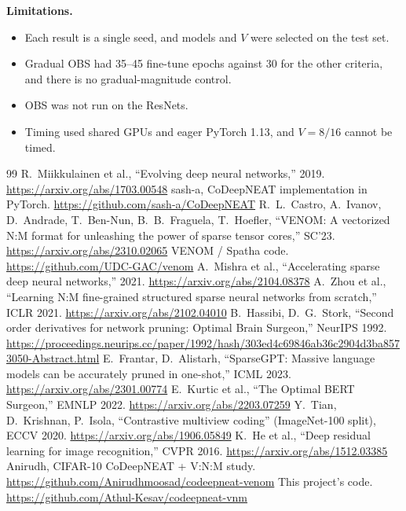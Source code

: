 \documentclass[10pt,a4paper]{article}
\newcommand{\B}[1]{\textbf{#1}}
\begin{document}
\B{Limitations.}
\begin{itemize}
\item Each result is a single seed, and models and $V$ were selected on the test set.
\item Gradual OBS had 35--45 fine-tune epochs against 30 for the other criteria, and there is no gradual-magnitude control.
\item OBS was not run on the ResNets.
\item Timing used shared GPUs and eager PyTorch 1.13, and $V{=}8/16$ cannot be timed.
\end{itemize}

\begin{thebibliography}{99}\small
\setlength{\itemsep}{0pt}
 R.~Miikkulainen et al., ``Evolving deep neural networks,'' 2019. \url{https://arxiv.org/abs/1703.00548}
 sash-a, CoDeepNEAT implementation in PyTorch. \url{https://github.com/sash-a/CoDeepNEAT}
 R.~L.~Castro, A.~Ivanov, D.~Andrade, T.~Ben-Nun, B.~B.~Fraguela, T.~Hoefler, ``VENOM: A vectorized N:M format for unleashing the power of sparse tensor cores,'' SC'23. \url{https://arxiv.org/abs/2310.02065}
 VENOM / Spatha code. \url{https://github.com/UDC-GAC/venom}
 A.~Mishra et al., ``Accelerating sparse deep neural networks,'' 2021. \url{https://arxiv.org/abs/2104.08378}
 A.~Zhou et al., ``Learning N:M fine-grained structured sparse neural networks from scratch,'' ICLR 2021. \url{https://arxiv.org/abs/2102.04010}
 B.~Hassibi, D.~G.~Stork, ``Second order derivatives for network pruning: Optimal Brain Surgeon,'' NeurIPS 1992. \url{https://proceedings.neurips.cc/paper/1992/hash/303ed4c69846ab36c2904d3ba8573050-Abstract.html}
 E.~Frantar, D.~Alistarh, ``SparseGPT: Massive language models can be accurately pruned in one-shot,'' ICML 2023. \url{https://arxiv.org/abs/2301.00774}
 E.~Kurtic et al., ``The Optimal BERT Surgeon,'' EMNLP 2022. \url{https://arxiv.org/abs/2203.07259}
 Y.~Tian, D.~Krishnan, P.~Isola, ``Contrastive multiview coding'' (ImageNet-100 split), ECCV 2020. \url{https://arxiv.org/abs/1906.05849}
 K.~He et al., ``Deep residual learning for image recognition,'' CVPR 2016. \url{https://arxiv.org/abs/1512.03385}
 Anirudh, CIFAR-10 CoDeepNEAT + V:N:M study. \url{https://github.com/Anirudhmoosad/codeepneat-venom}
 This project's code. \url{https://github.com/Athul-Kesav/codeepneat-vnm}
\end{thebibliography}
\end{document}

